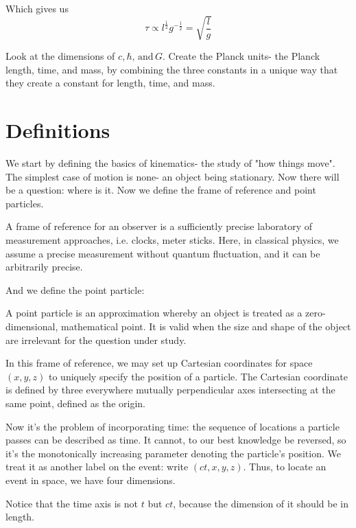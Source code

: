 \documentclass[10pt]{article}
\begin{document}
	Which gives us
	\begin{equation}
	  \tau \propto l^{\frac{1}{2}} g^{-\frac{1}{2}} = \sqrt{\frac{l}{g}}
	\end{equation}

	\begin{exercise}
		Look at the dimensions of $c,\hbar, \,\text{and} \, G$. Create the Planck units- the Planck length, time, and mass, by combining the three constants in a unique way that they create a constant for length, time, and mass.
	\end{exercise}

	
	\section{Definitions}
	We start by defining the basics of kinematics- the study of "how things move". The simplest case of motion is none- an object being stationary. Now there will be a question: where is it. Now we define the frame of reference and point particles. 
	\begin{definition}
		A frame of reference for an observer is a sufficiently precise laboratory of measurement approaches, i.e. clocks, meter sticks. Here, in classical physics, we assume a precise measurement without quantum fluctuation, and it can be arbitrarily precise.
	\end{definition}

	And we define the point particle:
	\begin{definition}
		A point particle is an approximation whereby an object is treated as a zero-dimensional, mathematical point. It is valid when the size and shape of the object are irrelevant for the question under study.
	\end{definition}

	In this frame of reference, we may set up Cartesian coordinates for space $(x,y,z)$ to uniquely specify the position of a particle. The Cartesian coordinate is defined by three everywhere mutually perpendicular axes intersecting at the same point, defined as the origin. 
	
	\vspace{\baselineskip}
	Now it's the problem of incorporating time: the sequence of locations a particle passes can be described as time. It cannot, to our best knowledge be reversed, so it's the monotonically increasing parameter denoting the particle's position. We treat it as another label on the event: write $(ct,x,y,z)$. Thus, to locate an event in space, we have four dimensions.
	\begin{remark}
		Notice that the time axis is not $t$ but $ct$, because the dimension of it should be in length.
	\end{remark}
\end{document}
